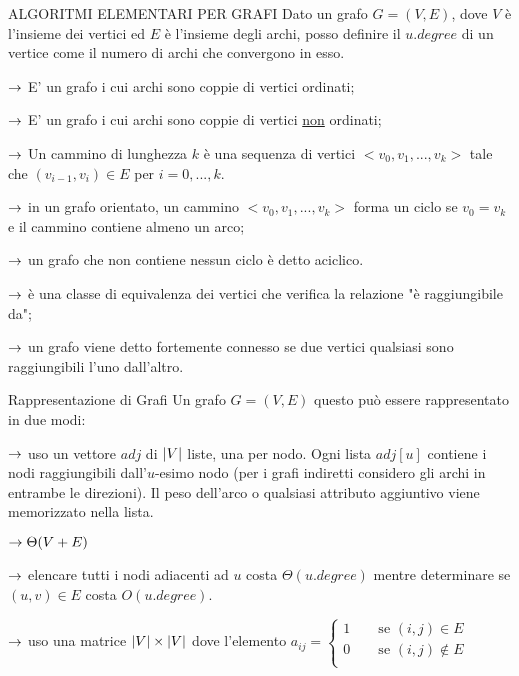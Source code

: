 \documentclass[8pt]{extarticle}
\begin{document}
\begin{formulario}
	\begin{myParagraph}{ALGORITMI ELEMENTARI PER GRAFI}
Dato un grafo $G=(V,E)$, dove $V$ è l'insieme dei vertici ed $E$ è l'insieme degli archi, posso definire il  $u.degree$ di un vertice come il numero di archi che convergono in esso.
		\begin{Descr}
			\item[Grafo Diretto] $\rightarrow$
E' un grafo i cui archi sono coppie di vertici ordinati;
			\item[Grafo Indiretto] $\rightarrow$
E' un grafo i cui archi sono coppie di vertici \underline{non} ordinati;
			\item[Cammino] $\rightarrow$ Un cammino di lunghezza $k$ è una sequenza di vertici $<v_0,v_1,...,v_k>$ tale che $(v_{i-1},v_i)\in E$ per $i=0,...,k$. 
			\begin{Descr}
				\item[Ciclo] $\rightarrow$ in un grafo orientato, un cammino $<v_0,v_1,...,v_k>$ forma un ciclo se $v_0=v_k$ e il cammino contiene almeno un arco;
				\item[Grafo Aciclico] $\rightarrow$ un grafo che non contiene nessun ciclo è detto aciclico.
			\end{Descr}
			\item[Componenti Connesse] $\rightarrow$ è una classe di equivalenza dei vertici che verifica la relazione "è raggiungibile da";
			\item[Grafo Fortemente Connesso] $\rightarrow$ un grafo viene detto fortemente connesso se due vertici qualsiasi sono raggiungibili l'uno dall'altro.
		\end{Descr}
		\begin{subParagraph}{Rappresentazione di Grafi}
Un grafo $G=(V,E)$ questo può essere rappresentato in due modi:
			\begin{Descr} 
				\item[Liste di Adiacenza] $\rightarrow$ uso un vettore $adj$ di $\left\vert V \right\vert$ liste, una per nodo. Ogni lista $adj[u]$ contiene i nodi raggiungibili dall'$u$-esimo nodo (per i grafi indiretti considero gli archi in entrambe le direzioni). Il peso dell'arco o qualsiasi attributo aggiuntivo viene memorizzato nella lista.
				\begin{Descr} 
					\item[Spazio] $\rightarrow \Theta(V+E)$
					\item[Tempo] $\rightarrow$ elencare tutti i nodi adiacenti ad $u$ costa $\Theta(u.degree)$ mentre determinare se $(u,v)\in E$ costa $O(u.degree)$.
				\end{Descr}
				\item[Matrice di Adiacenza] $\rightarrow$ uso una matrice $\left\vert V \right\vert\times\left\vert V \right\vert$ dove l'elemento $a_{ij}=\begin{cases}1\qquad\text{se } (i,j)\in E\\ 0\qquad\text{se } (i,j)\notin E\\ \end{cases}$ 

\end{Descr}
\end{subParagraph}
\end{myParagraph}
\end{formulario}
\end{document}
